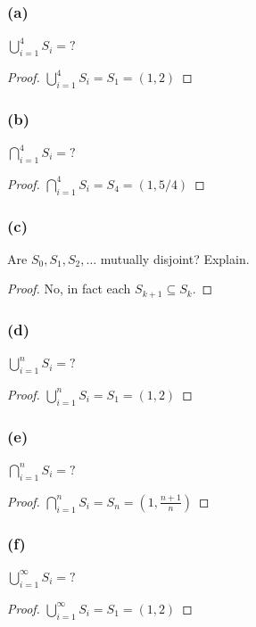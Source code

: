 \documentclass[14pt]{extarticle}
\newcommand{\dps}{\displaystyle}
\begin{document}
\subsubsection{(a)}
\(\dps \bigcup_{i=1}^{4}S_i = ?\)

\begin{proof}
\(\dps \bigcup_{i=1}^{4}S_i = S_1 = (1, 2)\)
\end{proof}

\subsubsection{(b)}
\(\dps \bigcap_{i=1}^{4}S_i = ?\)

\begin{proof}
\(\dps \bigcap_{i=1}^{4}S_i = S_4 = (1, 5/4)\)
\end{proof}

\subsubsection{(c)}
Are \(S_0, S_1, S_2, \ldots\) mutually disjoint? Explain.

\begin{proof}
No, in fact each \(S_{k+1} \subseteq S_k\).
\end{proof}

\subsubsection{(d)}
\(\dps \bigcup_{i=1}^{n}S_i = ?\)

\begin{proof}
\(\dps \bigcup_{i=1}^{n}S_i = S_1 = (1, 2)\)
\end{proof}

\subsubsection{(e)}
\(\dps \bigcap_{i=1}^{n}S_i = ?\)

\begin{proof}
\(\dps \bigcap_{i=1}^{n}S_i = S_n = (1, \frac{n+1}{n})\)
\end{proof}

\subsubsection{(f)}
\(\dps \bigcup_{i=1}^{\infty}S_i = ?\)

\begin{proof}
\(\dps \bigcup_{i=1}^{\infty}S_i = S_1 = (1, 2)\)
\end{proof}
\end{document}
